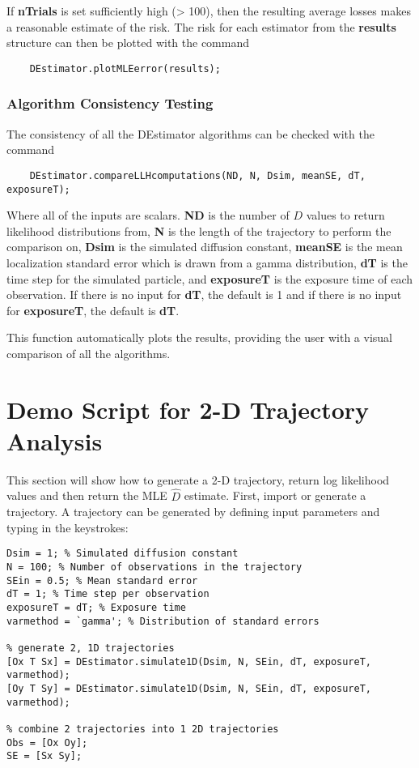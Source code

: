 \documentclass{article}
\begin{document}
If \textbf{nTrials} is set sufficiently high (> 100), then the resulting average losses makes a reasonable estimate of the risk.  The risk for each estimator from the \textbf{results} structure can then be plotted with the command
\begin{verbatim}
    DEstimator.plotMLEerror(results);
\end{verbatim}

\subsubsection{Algorithm Consistency Testing}
The consistency of all the DEstimator algorithms can be checked with the command
\begin{verbatim}
    DEstimator.compareLLHcomputations(ND, N, Dsim, meanSE, dT, exposureT);
\end{verbatim}
Where all of the inputs are scalars.  \textbf{ND} is the number of $D$ values to return likelihood distributions from, \textbf{N} is the length of the trajectory to perform the comparison on, \textbf{Dsim} is the simulated diffusion constant, \textbf{meanSE} is the mean localization standard error which is drawn from a gamma distribution, \textbf{dT} is the time step for the simulated particle, and \textbf{exposureT} is the exposure time of each observation.  If there is no input for \textbf{dT}, the default is 1 and if there is no input for \textbf{exposureT}, the default is \textbf{dT}.

This function automatically plots the results, providing the user with a visual comparison of all the algorithms.

\section{Demo Script for 2-D Trajectory Analysis}

This section will show how to generate a 2-D trajectory, return log likelihood values and then return the MLE $\hat{D}$ estimate.  First, import or generate a trajectory.  A trajectory can be generated by defining input parameters and typing in the keystrokes:
\begin{verbatim}
Dsim = 1; % Simulated diffusion constant
N = 100; % Number of observations in the trajectory
SEin = 0.5; % Mean standard error
dT = 1; % Time step per observation
exposureT = dT; % Exposure time
varmethod = `gamma'; % Distribution of standard errors

% generate 2, 1D trajectories
[Ox T Sx] = DEstimator.simulate1D(Dsim, N, SEin, dT, exposureT, varmethod);
[Oy T Sy] = DEstimator.simulate1D(Dsim, N, SEin, dT, exposureT, varmethod);

% combine 2 trajectories into 1 2D trajectories
Obs = [Ox Oy];
SE = [Sx Sy];
\end{verbatim}
\end{document}
